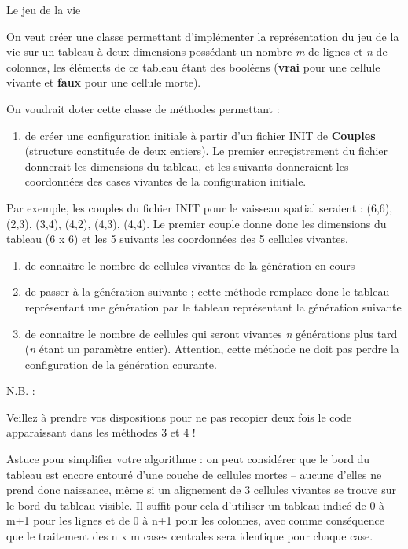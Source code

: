 \begin{Exercice}{Le jeu de la vie}
\bigskip


\bigskip

{
{On veut créer une classe permettant
d’implémenter la représentation du jeu de la vie sur un tableau à deux
dimensions possédant un nombre
}{\textit{m}}{ de
lignes et
}{\textit{n}}{ de
colonnes, les éléments de ce tableau étant des booléens
(}{\textbf{vrai}}{ pour
une cellule vivante et
}{\textbf{faux}}{ pour
une cellule morte).}}

{
On voudrait doter cette classe de méthodes permettant :}

\begin{enumerate}
\item {
{de créer une configuration initiale à partir
d’un fichier INIT de
}{\textbf{Couples}}{
(structure constituée de deux entiers). Le premier enregistrement du
fichier }{donnerait les dimensions du tableau,
et les suivants donneraient les coordonnées des cases vivantes de la
configuration initiale.}}
\end{enumerate}
{
Par exemple, les couples du fichier INIT pour le vaisseau spatial
seraient : (6,6), (2,3), (3,4), (4,2), (4,3), (4,4). Le premier couple
donne donc les dimensions du tableau (6 x 6) et les 5 suivants les
coordonnées des 5 cellules vivantes.}

\setcounter{saveenum}{\value{enumi}}
\begin{enumerate}
\setcounter{enumi}{\value{saveenum}}
\item {
de connaitre le nombre de cellules vivantes de la génération en cours}
\item {
de passer à la génération suivante ; cette méthode remplace donc le
tableau représentant une génération par le tableau représentant la
génération suivante}
\item {
{de connaitre le nombre de cellules qui seront
vivantes }{\textit{n}}{
générations plus tard
(}{\textit{n}}{ étant
un paramètre entier). Attention, cette méthode ne doit pas perdre la
configuration de la génération courante.}}
\end{enumerate}
{
N.B. :}

\begin{liste}
\item {
Veillez à prendre vos dispositions pour ne pas recopier deux fois le
code apparaissant dans les méthodes 3 et 4 !}
\item {
{Astuce pour simplifier votre
algorithme}{ : on peut considérer que le bord
du tableau est encore entouré d’une couche de cellules mortes – aucune
d’elles ne prend donc naissance, même si un alignement de 3 cellules
vivantes se trouve sur le bord du tableau visible. Il suffit pour cela
d’utiliser un tableau indicé de 0 à m+1 pour les lignes et de 0 à n+1
pour les colonnes, avec comme conséquence que le traitement des n x m
cases centrales sera identique pour chaque case.}}
\end{liste}

\end{Exercice}

